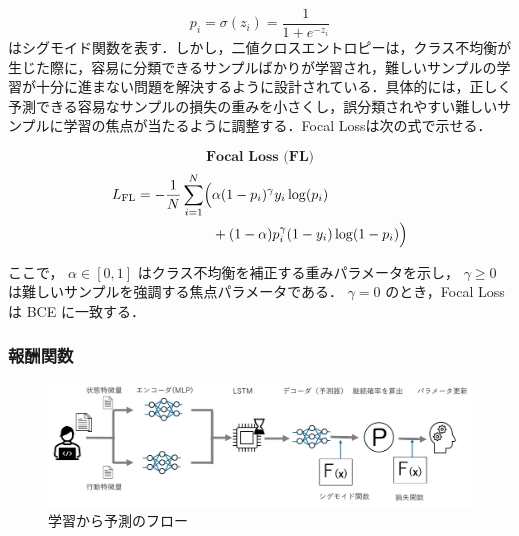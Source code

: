 \documentclass[submit,techrep,noauthor]{ipsj}
\begin{document}
\[p_i = \sigma(z_i) = \frac{1}{1 + e^{-z_i}}\]はシグモイド関数を表す．しかし，二値クロスエントロピーは，クラス不均衡が生じた際に，容易に分類できるサンプルばかりが学習され，難しいサンプルの学習が十分に進まない問題を解決するように設計されている．具体的には，正しく予測できる容易なサンプルの損失の重みを小さくし，誤分類されやすい難しいサンプルに学習の焦点が当たるように調整する．Focal Lossは次の式で示せる．




\[\textbf{Focal Loss (FL)}\]
\begin{align}
L_{\mathrm{FL}} = - \frac{1}{N} \sum_{i=1}^{N} \Bigl( & \alpha (1 - p_i)^{\gamma} y_i \log(p_i) \nonumber \\
& + (1 - \alpha) p_i^{\gamma} (1 - y_i) \log(1 - p_i) \Bigr) \nonumber 
\end{align}


ここで，
\(\alpha \in [0,1]\) はクラス不均衡を補正する重みパラメータを示し，
\(\gamma \ge 0\) は難しいサンプルを強調する焦点パラメータである．  
\(\gamma = 0\) のとき，Focal Loss は BCE に一致する．


\subsubsection{報酬関数}
\begin{figure}[t]
    \centering
    \includegraphics[width = 1.0\textwidth]{./Hashimoto_fig/prediction.pdf}
    \caption{学習から予測のフロー}
    \label{fig:RL}
\end{figure}
\end{document}
